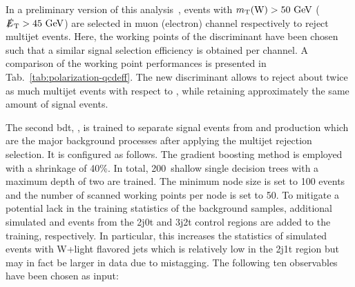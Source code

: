 In a preliminary version of this analysis~\cite{CMS-PAS-TOP-13-001}, events with $m_{\mathrm{T}}(\mathrm{W})>50~\mathrm{GeV}$ ($\slashed{E}_{\mathrm{T}}>45~\mathrm{GeV}$) are selected in muon (electron) channel respectively to reject multijet events. Here, the working points of the \bdtqcd discriminant have been chosen such that a similar signal selection efficiency is obtained per channel. A comparison of the working point performances is presented in Tab.~\ref{tab:polarization-qcdeff}. The new \bdtqcd discriminant allows to reject about twice as much multijet events with respect to \mtw, \met while retaining approximately the same amount of signal events.


The second \gls{bdt}, \bdttch, is trained to separate signal events from \wjets and \ttbar production which are the major background processes after applying the multijet rejection selection. It is configured as follows. The gradient boosting method is employed with a shrinkage of 40\%. In total, 200~shallow single decision trees with a maximum depth of two are trained. The minimum node size is set to 100 events and the number of scanned working points per node is set to 50. To mitigate a potential lack in the training statistics of the background samples, additional simulated \wjets and \ttbar events from the 2j0t and 3j2t control regions are added to the training, respectively. In particular, this increases the statistics of simulated events with W+light flavored jets which is relatively low in the 2j1t region but may in fact be larger in data due to mistagging. The following ten observables have been chosen as input:

